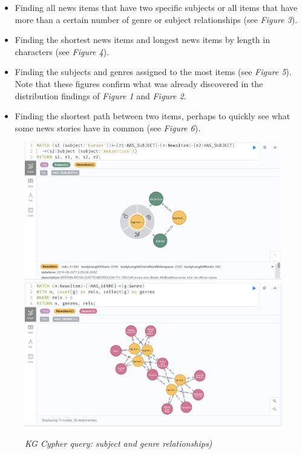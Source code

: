 \documentclass[11pt]{article}
\begin{document}
  \begin{itemize}
    \item{Finding all news items that have two specific subjects or all items that have more than a certain number of genre or subject relationships (see \textit{Figure 3}).}
    \item{Finding the shortest news items and longest news items by length in characters (see \textit{Figure 4}).}
    \item{Finding the subjects and genres assigned to the most items (see \textit{Figure 5}). Note that these figures confirm what was already discovered in the distribution findings of \textit{Figure 1} and \textit{Figure 2}.}
    \item{Finding the shortest path between two items, perhaps to quickly see what some news stories have in common (see \textit{Figure 6}).}
  \end{itemize}

  \begin{figure}
    \includegraphics[scale=0.2]{00-news-items-antarctica-europe}
    \includegraphics[scale=0.2]{00-news-items-more-than-five-genres}
    \caption{\textit{KG Cypher query: subject and genre relationships)}}
  \end{figure}
\end{document}
